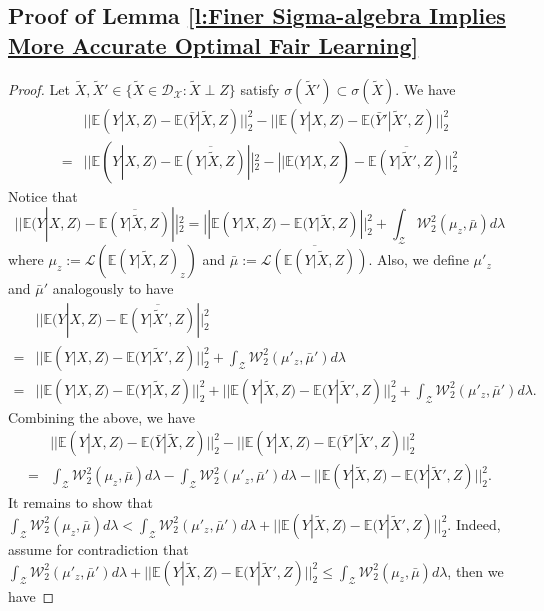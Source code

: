 \documentclass[twoside,11pt]{article}
\begin{document}
\subsection{Proof of Lemma \ref{l:Finer Sigma-algebra Implies More Accurate Optimal Fair Learning}}

\begin{proof}
Let $\tilde{X}, \tilde{X}' \in \{ \tilde{X} \in \mathcal{D}_{\mathcal{X}}: \tilde{X} \perp Z\}$ satisfy $\sigma(\tilde{X}') \subset \sigma(\tilde{X})$. We have
\begin{align*}
& ||\mathbb{E}(Y|X,Z) - \mathbb{E}(\bar{Y}|\tilde{X},Z)||_2^2 - ||\mathbb{E}(Y|X,Z) - \mathbb{E}(\bar{Y}'|\tilde{X}',Z)||_2^2\\
= & ||\mathbb{E}(Y|X,Z) - \overline{\mathbb{E}(Y|\tilde{X},Z)}||_2^2 - ||\mathbb{E}(Y|X,Z) - \overline{\mathbb{E}(Y|\tilde{X}',Z)}||_2^2
\end{align*}
Notice that
\begin{equation*}
||\mathbb{E}(Y|X,Z) - \overline{\mathbb{E}(Y|\tilde{X},Z)}||_2^2 = ||\mathbb{E}(Y|X,Z) - \mathbb{E}(Y|\tilde{X},Z)||_2^2 + \int_{\mathcal{Z}} \mathcal{W}_2^2(\mu_z, \bar{\mu}) d\lambda
\end{equation*}
where $\mu_z := \mathcal{L}(\mathbb{E}(Y|\tilde{X},Z)_z)$ and $\bar{\mu} := \overline{\mathcal{L}(\mathbb{E}(Y|\tilde{X},Z))}$. Also, we define $\mu'_z$ and $\bar{\mu}'$ analogously to have
\begin{align*}
& ||\mathbb{E}(Y|X,Z) - \overline{\mathbb{E}(Y|\tilde{X}',Z)}||_2^2\\
= & ||\mathbb{E}(Y|X,Z) - \mathbb{E}(Y|\tilde{X}',Z)||_2^2 + \int_{\mathcal{Z}} \mathcal{W}_2^2(\mu'_z, \bar{\mu}') d\lambda\\
= & ||\mathbb{E}(Y|X,Z) - \mathbb{E}(Y|\tilde{X},Z)||_2^2 + ||\mathbb{E}(Y|\tilde{X},Z) - \mathbb{E}(Y|\tilde{X}',Z)||_2^2 + \int_{\mathcal{Z}} \mathcal{W}_2^2(\mu'_z, \bar{\mu}') d\lambda.
\end{align*}
Combining the above, we have
\begin{align*}
& ||\mathbb{E}(Y|X,Z) - \mathbb{E}(\bar{Y}|\tilde{X},Z)||_2^2 - ||\mathbb{E}(Y|X,Z) - \mathbb{E}(\bar{Y}'|\tilde{X}',Z)||_2^2\\
= & \int_{\mathcal{Z}} \mathcal{W}_2^2(\mu_z, \bar{\mu})d\lambda - \int_{\mathcal{Z}} \mathcal{W}_2^2(\mu'_z, \bar{\mu}')d\lambda - ||\mathbb{E}(Y|\tilde{X},Z) - \mathbb{E}(Y|\tilde{X}',Z)||_2^2.
\end{align*}
It remains to show that $\int_{\mathcal{Z}} \mathcal{W}_2^2(\mu_z, \bar{\mu})d\lambda < \int_{\mathcal{Z}} \mathcal{W}_2^2(\mu'_z, \bar{\mu}')d\lambda + ||\mathbb{E}(Y|\tilde{X},Z) - \mathbb{E}(Y|\tilde{X}',Z)||_2^2$. Indeed, assume for contradiction that $\int_{\mathcal{Z}} \mathcal{W}_2^2(\mu'_z, \bar{\mu}')d\lambda + ||\mathbb{E}(Y|\tilde{X},Z) - \mathbb{E}(Y|\tilde{X}',Z)||_2^2 \leq \int_{\mathcal{Z}} \mathcal{W}_2^2(\mu_z, \bar{\mu})d\lambda$, then we have

\end{proof}
\end{document}
